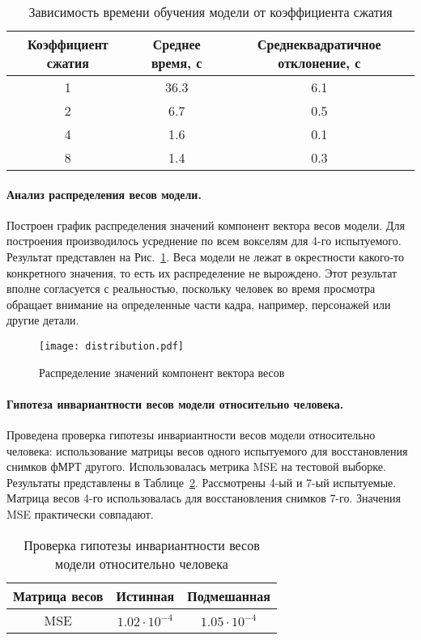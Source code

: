\documentclass[a4paper, 12pt]{extarticle}
\begin{document}
\begin{table}[h!]
	\centering
	\caption{Зависимость времени обучения модели от коэффициента сжатия}
	\begin{tabular}{|c|c|c|}
		\hline
		Коэффициент сжатия & Среднее время, с & Среднеквадратичное отклонение, с \\ \hline \hline
		1 & 36.3 & 6.1 \\ \hline
		2 & 6.7 & 0.5 \\ \hline
		4 & 1.6 & 0.1 \\ \hline
		8 & 1.4 & 0.3 \\ \hline
	\end{tabular}
	\label{table:coeffs}
\end{table}

\paragraph*{Анализ распределения весов модели.}

Построен график распределения значений компонент вектора весов модели.
Для построения производилось усреднение по всем вокселям для 4-го испытуемого.
Результат представлен на Рис.~\ref{fig:w-distr}.
Веса модели не лежат в окрестности какого-то конкретного значения, 
то есть их распределение не вырождено.
Этот результат вполне согласуется с реальностью, поскольку человек во время просмотра
обращает внимание на определенные части кадра, например, персонажей или
другие детали.

\begin{figure}[h!]
	\centering
	\texttt{[image: distribution.pdf]}
	\caption{Распределение значений компонент вектора весов}
	\label{fig:w-distr}
\end{figure}

\paragraph*{Гипотеза инвариантности весов модели относительно человека.}

Проведена проверка гипотезы инвариантности весов модели относительно человека:
использование матрицы весов одного испытуемого для восстановления снимков фМРТ другого.
Использовалась метрика MSE на тестовой выборке.
Результаты представлены в Таблице~\ref{table:inv}.
Рассмотрены 4-ый и 7-ый испытуемые. Матрица весов 4-го использовалась для восстановления
снимков 7-го.
Значения MSE практически совпадают. 

\begin{table}[h!]
	\centering
	\caption{Проверка гипотезы инвариантности весов модели относительно человека}
	\begin{tabular}{|c|c|c|}
		\hline
		Матрица весов & Истинная             & Подмешанная          \\ \hline \hline
		MSE           & $1.02 \cdot 10^{-4}$ & $1.05 \cdot 10^{-4}$ \\ \hline
	\end{tabular}
	\label{table:inv}
\end{table}
\end{document}
